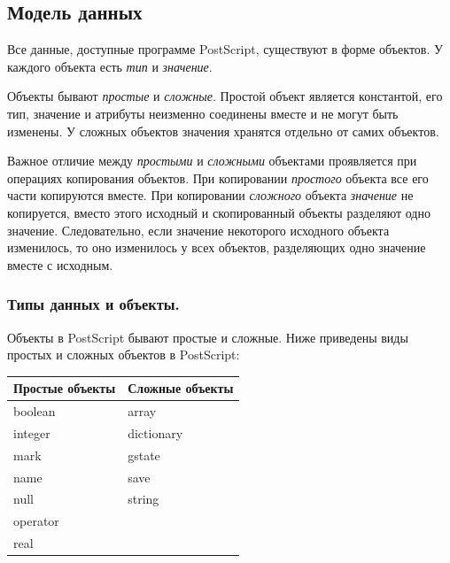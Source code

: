 \subsection{Модель данных}
Все данные, доступные программе PostScript, существуют в форме объектов. У каждого объекта есть \textit{тип} и \textit{значение}. %

Объекты бывают \textit{простые} и \textit{сложные}. Простой объект является константой, его тип, значение и атрибуты неизменно соединены вместе и не могут быть изменены. У сложных объектов значения хранятся отдельно от самих объектов. 

Важное отличие между \textit{простыми} и \textit{сложными} объектами проявляется при операциях копирования объектов. При копировании \textit{простого} объекта все его части копируются вместе. При копировании \textit{сложного} объекта \textit{значение} не копируется, вместо этого исходный и скопированный объекты разделяют одно значение.
Следовательно, если значение некоторого исходного объекта изменилось, то оно изменилось у всех объектов, разделяющих одно значение вместе с исходным.



\subsubsection*{Типы данных и объекты.}

Объекты в PostScript бывают простые и сложные. Ниже приведены виды простых и сложных объектов в PostScript:

\begin{center}

\begin{tabular}[t]{|p{12em}|p{12em}|}
\hline
Простые объекты & Сложные объекты\\
\hline
boolean & array\\
integer & dictionary\\
mark & gstate\\
name & save\\
null & string\\
operator & \\
real & \\
\hline
\end{tabular}

\end{center}
$$ $$

